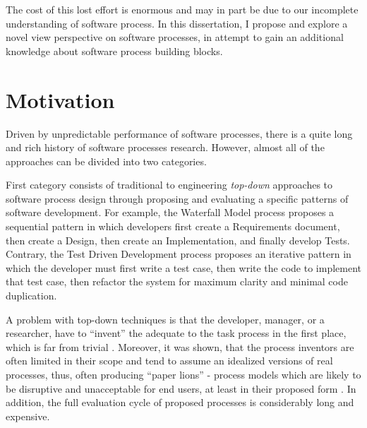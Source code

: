 
The cost of this lost effort is enormous and may in part be due to our incomplete understanding of software process. 
In this dissertation, I propose and explore a novel view perspective on software processes, in attempt to gain 
an additional knowledge about software process building blocks.

\section{Motivation}
Driven by unpredictable performance of software processes, there is a quite long and rich history of software 
processes research. However, almost all of the approaches can be divided into two categories.

First category consists of traditional to engineering \textit{top-down} approaches to software process 
design through proposing and evaluating a specific patterns of software development. 
For example, the Waterfall Model process proposes a sequential pattern in which 
developers first create a Requirements document, then create a Design, then create an Implementation, and 
finally develop Tests. Contrary, the Test Driven Development process proposes an iterative pattern in which the
developer must first write a test case, then write the code to implement that test case, then refactor the system for
maximum clarity and minimal code duplication. 

A problem with top-down techniques is that the developer, manager, or a researcher, have to ``invent'' the adequate to
the task process in the first place, which is far from trivial \cite{citeulike:5043104} \cite{citeulike:1986013}. 
Moreover, it was shown, that the process inventors are often limited in their scope and tend to assume an idealized
versions of real processes, thus, often producing ``paper lions''
- process models which are likely to be disruptive and unacceptable for end users, at least in their proposed form
\cite{citeulike:9758924}. In addition, the full evaluation cycle of proposed processes is considerably long and
expensive.

